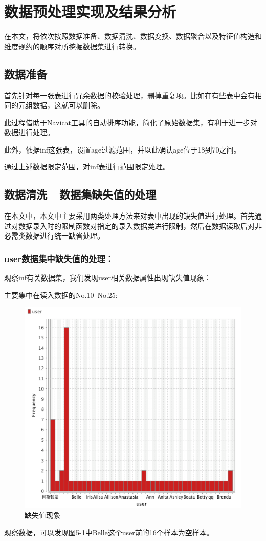 \section{数据预处理实现及结果分析}
在本文，将依次按照数据准备、数据清洗、数据变换、数据聚合以及特征值构造和维度规约的顺序对所挖掘数据集进行转换。

\subsection{数据准备}
首先针对每一张表进行冗余数据的校验处理，删掉重复项。比如在有些表中会有相同的元组数据，这就可以删除。

此过程借助于Navicat工具的自动排序功能，简化了原始数据集，有利于进一步对数据进行处理。

此外，依据inf这张表，设置age过滤范围，并以此确认age位于18到70之间。

通过上述数据限定范围，对inf表进行范围限定处理。

\subsection{数据清洗—数据集缺失值的处理}
在本文中，本文中主要采用两类处理方法来对表中出现的缺失值进行处理。首先通过对数据录入时的限制函数对指定的录入数据类进行限制，然后在数据读取后对非必需类数据进行统一缺省处理。

\subsubsection{user数据集中缺失值的处理：}
观察inf有关数据集，我们发现user相关数据属性出现缺失值现象：

主要集中在读入数据的No.10~No.25:

\begin{figure}[thbp!]
	\centering
	\includegraphics[width=0.4\linewidth]{figure/5-1}
	\caption{缺失值现象}
	\label{fig:5-1}
\end{figure}

观察数据，可以发现图5-1中Belle这个user前的16个样本为空样本。

